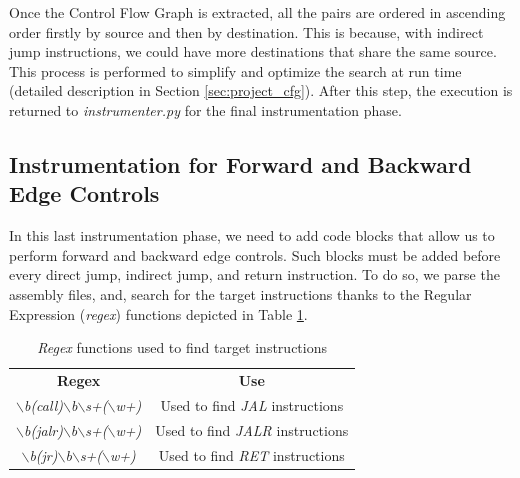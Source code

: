 Once the Control Flow Graph is extracted, all the pairs are ordered in ascending
order firstly by source and then by destination. This is because, with indirect jump
instructions, we could have more destinations that share the same source. This process
is performed to simplify and optimize the search at run time (detailed
description in Section \ref{sec:project_cfg}). After this step, the execution is
returned to \textit{instrumenter.py} for the final instrumentation phase.

\subsection{Instrumentation for Forward and Backward Edge Controls}
\label{subsec:project_instrcontrols}

In this last instrumentation phase, we need to add code blocks that allow us to
perform forward and backward edge controls. Such blocks must be added before every
direct jump, indirect jump, and return instruction. To do so, we parse the assembly
files, and, search for the target instructions thanks to the Regular Expression (\textit{regex})
functions depicted in Table \ref{tab:regexes}.

\begin{table}
  \centering
  \begin{tabular}{|c|c|}
    \hline
    \textbf{Regex}                                                                      & \textbf{Use}                            \\
    \hhline{==} \textit{$\backslash$b(call)$\backslash$b$\backslash$s+($\backslash$w+)} & Used to find \textit{JAL} instructions  \\
    \hline
    \textit{$\backslash$b(jalr)$\backslash$b$\backslash$s+($\backslash$w+)}             & Used to find \textit{JALR} instructions \\
    \hline
    \textit{$\backslash$b(jr)$\backslash$b$\backslash$s+($\backslash$w+)}               & Used to find \textit{RET} instructions  \\
    \hline
  \end{tabular}
  \caption{\textit{Regex} functions used to find target instructions}
  \label{tab:regexes}
\end{table}

